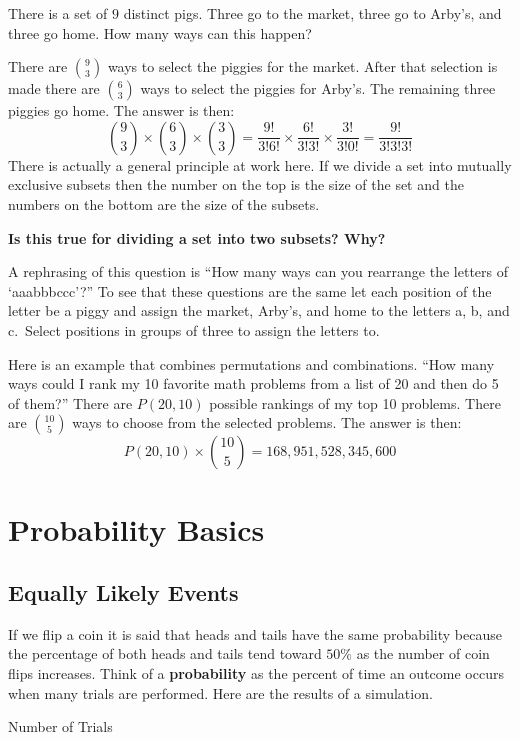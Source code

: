 \documentclass[
]{book}
\begin{document}
There is a set of \(9\) distinct pigs. Three go to the market, three go to Arby's, and three go home. How many ways can this happen?

There are \(9 \choose 3\) ways to select the piggies for the market. After that selection is made there are \(6 \choose 3\) ways to select the piggies for Arby's. The remaining three piggies go home. The answer is then:
\[{9 \choose 3}\times{6 \choose 3} \times {3 \choose 3} = \frac{9!}{3!6!}\times \frac{6!}{3!3!} \times \frac{3!}{3!0!} = \frac{9!}{3!3!3!}\]
There is actually a general principle at work here. If we divide a set into mutually exclusive subsets then the number on the top is the size of the set and the numbers on the bottom are the size of the subsets.

\textbf{Is this true for dividing a set into two subsets? Why?}

A rephrasing of this question is ``How many ways can you rearrange the letters of `aaabbbccc'?'' To see that these questions are the same let each position of the letter be a piggy and assign the market, Arby's, and home to the letters a, b, and c.~Select positions in groups of three to assign the letters to.

Here is an example that combines permutations and combinations. ``How many ways could I rank my 10 favorite math problems from a list of 20 and then do 5 of them?'' There are \(P(20,10)\) possible rankings of my top 10 problems. There are \(10 \choose 5\) ways to choose from the selected problems. The answer is then:
\[P(20,10)\times{10 \choose 5} = 168,951,528,345,600\]

\hypertarget{probability-basics}{%
\chapter{Probability Basics}\label{probability-basics}}

\hypertarget{equiprob}{%
\section{Equally Likely Events}\label{equiprob}}

If we flip a coin it is said that heads and tails have the same probability because the percentage of both heads and tails tend toward \(50\%\) as the number of coin flips increases. Think of a \textbf{probability} as the percent of time an outcome occurs when many trials are performed. Here are the results of a simulation.

Number of Trials
\end{document}
